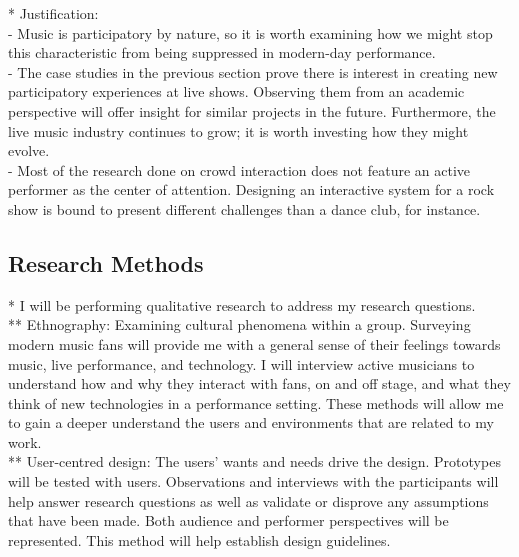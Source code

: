 * Justification:\\
- Music is participatory by nature, so it is worth examining how we might stop this characteristic from being suppressed in modern-day performance.\\
- The case studies in the previous section prove there is interest in creating new participatory experiences at live shows. Observing them from an academic perspective will offer insight for similar projects in the future. Furthermore, the live music industry continues to grow; it is worth investing how they might evolve.\\
- Most of the research done on crowd interaction does not feature an active performer as the center of attention. Designing an interactive system for a rock show is bound to present different challenges than a dance club, for instance.

\subsection{Research Methods}

* I will be performing qualitative research to address my research questions.\\
** Ethnography: Examining cultural phenomena within a group. Surveying modern music fans will provide me with a general sense of their feelings towards music, live performance, and technology. I will interview active musicians to understand how and why they interact with fans, on and off stage, and what they think of new technologies in a performance setting. These methods will allow me to gain a deeper understand the users and environments that are related to my work.\\
** User-centred design: The users' wants and needs drive the design. Prototypes will be tested with users. Observations and interviews with the participants will help answer research questions as well as validate or disprove any assumptions that have been made. Both audience and performer perspectives will be represented. This method will help establish design guidelines.

